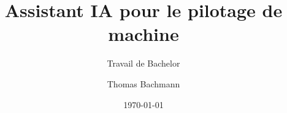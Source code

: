 \author{Thomas Bachmann}

\setmale

\title{Assistant IA pour le pilotage de machine}

\subtitle{Travail de Bachelor}


\date{\today}

